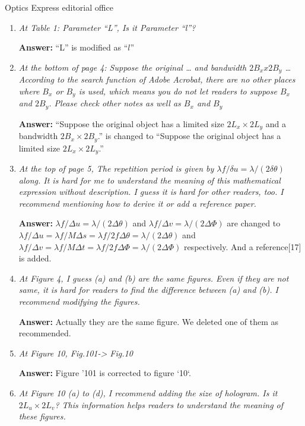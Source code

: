 \documentclass[a4paper,11pt]{letter}
\begin{document}
\begin{letter}{Optics Express editorial office}
\begin{enumerate}

\item \textit{At Table 1: Parameter “L”, Is it Parameter “l”?}

\bigskip
\textbf{Answer:}
“L” is modified as “$l$”

\item \textit{At the bottom of page 4: Suppose the original … and bandwidth $2B_x x 2B_y$ … \\
According to the search function of Adobe Acrobat, there are no other places where $B_x$ or $B_y$ is used, which means you do not let readers to suppose $B_x$ and $2B_y$. Please check other notes as well as $B_x$ and $B_y$}

\bigskip
\textbf{Answer:}
“Suppose the original object has a limited size $2L_x\times 2L_y$ and a bandwidth $2B_x\times 2B_y$.” is changed to “Suppose the original object has a limited size $2L_x\times 2L_y$.”\\

\item \textit{At the top of page 5, The repetition period is given by $\lambda f / \delta u=\lambda/(2 \delta \theta)$ along. It is hard for me to understand the meaning of this mathematical expression without description. I guess it is hard for other readers, too. I recommend mentioning how to derive it or add a reference paper. } 

\bigskip
\textbf{Answer:} 
$\lambda f/\Delta u=\lambda/(2\Delta \theta)$ and $\lambda f/\Delta v=\lambda/(2\Delta \Phi)$ are changed to $\lambda f/\Delta u=\lambda f/M\Delta s=\lambda f/2f\Delta\theta=\lambda/(2\Delta \theta)$ and $\lambda f/\Delta v=\lambda f/M\Delta t=\lambda f/2f\Delta\Phi=\lambda/(2\Delta\Phi)$ respectively. And a reference[17] is added.\\

\item \textit{At Figure 4, I guess (a) and (b) are the same figures. Even if they are not same, it is hard for readers to find the difference between (a) and (b). I recommend modifying the figures.}

\bigskip
\textbf{Answer:} 
Actually they are the same figure. We deleted one of them as recommended.

\item \textit{At Figure 10, Fig.101-> Fig.10}

\bigskip
\textbf{Answer:} 
Figure '101 is corrected to figure `10`.

\item \textit{At Figure 10 (a) to (d), I recommend adding the size of hologram. Is it $2L_u\times 2L_v$? This information helps readers to understand the meaning of these figures.}


\end{enumerate}
\end{letter}
\end{document}
